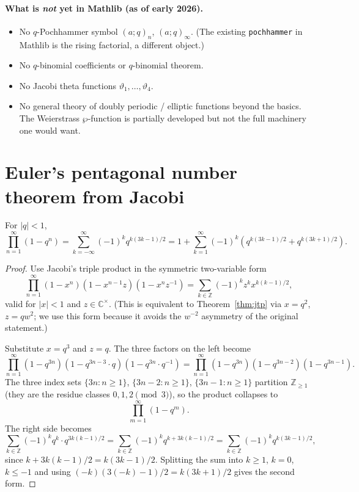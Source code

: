 \paragraph{What is \emph{not} yet in Mathlib (as of early 2026).}
\begin{itemize}\item No $q$-Pochhammer symbol $(a;q)_n$, $(a;q)_\infty$. (The existing \texttt{pochhammer} in Mathlib is the rising factorial, a different object.)
\item No $q$-binomial coefficients or $q$-binomial theorem.
\item No Jacobi theta functions $\vartheta_1, \ldots, \vartheta_4$.
\item No general theory of doubly periodic / elliptic functions beyond the basics. The Weierstrass $\wp$-function is partially developed but not the full machinery one would want.
\end{itemize}


\section{Euler's pentagonal number theorem from Jacobi}
\label{sec:pentagonal}

\begin{theorem}[Euler]
For $|q| < 1$,
\[
\prod_{n=1}^\infty (1 - q^n) = \sum_{k = -\infty}^\infty (-1)^k q^{k(3k-1)/2}
= 1 + \sum_{k=1}^\infty (-1)^k \left( q^{k(3k-1)/2} + q^{k(3k+1)/2} \right).
\]
\end{theorem}

\begin{proof}
Use Jacobi's triple product in the symmetric two-variable form
\[
\prod_{n=1}^\infty (1 - x^n)(1 - x^{n-1} z)(1 - x^n z^{-1}) = \sum_{k \in \mathbb{Z}} (-1)^k z^k x^{k(k-1)/2},
\tag{$\star$}
\]
valid for $|x| < 1$ and $z \in \mathbb{C}^\times$. (This is equivalent to Theorem~\ref{thm:jtp} via $x = q^2$, $z = q w^2$; we use this form because it avoids the $w^{-2}$ asymmetry of the original statement.)

Substitute $x = q^3$ and $z = q$. The three factors on the left become
\[
\prod_{n=1}^\infty (1 - q^{3n})(1 - q^{3n - 3} \cdot q)(1 - q^{3n} \cdot q^{-1})
= \prod_{n=1}^\infty (1 - q^{3n})(1 - q^{3n-2})(1 - q^{3n-1}).
\]
The three index sets $\{3n : n \geq 1\}$, $\{3n - 2 : n \geq 1\}$, $\{3n - 1 : n \geq 1\}$ partition $\mathbb{Z}_{\geq 1}$ (they are the residue classes $0, 1, 2 \pmod 3$), so the product collapses to
\[
\prod_{m=1}^\infty (1 - q^m).
\]
The right side becomes
\[
\sum_{k \in \mathbb{Z}} (-1)^k q^k \cdot q^{3k(k-1)/2}
= \sum_{k \in \mathbb{Z}} (-1)^k q^{k + 3k(k-1)/2}
= \sum_{k \in \mathbb{Z}} (-1)^k q^{k(3k-1)/2},
\]
since $k + 3k(k-1)/2 = k(3k-1)/2$. Splitting the sum into $k \geq 1$, $k = 0$, $k \leq -1$ and using $(-k)(3(-k)-1)/2 = k(3k+1)/2$ gives the second form.
\end{proof}

